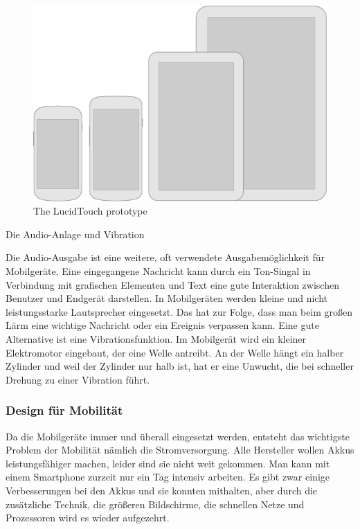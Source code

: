  \begin{figure}[h]
 \centering
 \includegraphics[height=0.25\textheight]{img/devices_displays_main.png}
 \caption{The LucidTouch prototype}
\end{figure}

Die Audio-Anlage und Vibration

Die Audio-Ausgabe ist eine weitere, oft verwendete Ausgabemöglichkeit für Mobilgeräte. Eine eingegangene Nachricht kann durch ein Ton-Singal in Verbindung mit grafischen Elementen und Text eine gute Interaktion zwischen Benutzer und Endgerät darstellen. In Mobilgeräten werden kleine und nicht leistungsstarke Lautsprecher eingesetzt. Das hat zur Folge, dass man beim großen Lärm eine wichtige Nachricht oder ein Ereignis verpassen kann. Eine gute Alternative ist eine Vibrationsfunktion. Im Mobilgerät wird ein kleiner Elektromotor eingebaut, der eine Welle antreibt. An der Welle hängt ein halber Zylinder und weil der Zylinder nur halb ist, hat er eine Unwucht, die bei schneller Drehung zu einer Vibration führt.



\subsubsection{Design für Mobilität} %
\label{ssub:weiterf_hrung}

Da die Mobilgeräte immer und überall eingesetzt werden, entsteht das wichtigste Problem der Mobilität nämlich die Stromversorgung. Alle Hersteller wollen Akkus leistungsfähiger machen, leider sind sie nicht weit gekommen. Man kann mit einem Smartphone zurzeit nur ein Tag intensiv arbeiten. Es gibt zwar einige Verbesserungen bei den Akkus und sie konnten mithalten, aber durch die zusätzliche Technik, die größeren Bildschirme, die schnellen Netze und Prozessoren wird es wieder aufgezehrt.

